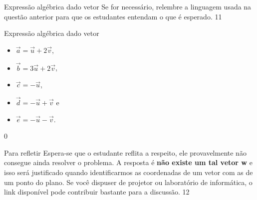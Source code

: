 \marginpar{\vspace{-2em}}
\begin{sugestions}{Expressão algébrica dado vetor}
{
Se for necessário, relembre a linguagem usada na questão anterior para que os estudantes entendam o que é esperado.
}{1}{1}
\end{sugestions}
\marginpar{\vspace{-1em}}
\begin{answer}{Expressão algébrica dado vetor}
{
\begin{itemize}
\item \(\vec{a}=\vec{u} + 2\vec{v}\),

\item \(\vec{b}=3\vec{u} + 2\vec{v}\),

\item \(\vec{c}=-\vec{u}\),

\item \(\vec{d}=-\vec{u} + \vec{v}\) e

\item \(\vec{e}=-\vec{u}-\vec{v}\).
\end{itemize}
}{0}
\end{answer}
\begin{sugestions}{Para refletir}
{
Espera-se que o estudante reflita a respeito, ele provavelmente não consegue ainda resolver o problema. A resposta é \textbf{não existe um tal vetor w} e isso será justificado quando identificarmos as coordenadas de um vetor com as de um ponto do plano. Se você dispuser de projetor ou laboratório de informática, o link disponível pode contribuir bastante para a discussão.
}{1}{2}
\end{sugestions}

